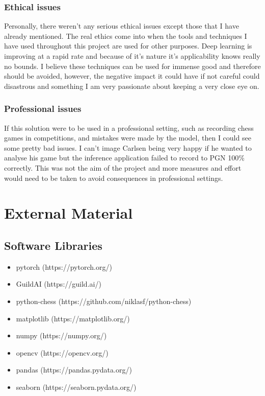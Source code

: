 \begin{appendices}
\subsection{Ethical issues}
Personally, there weren't any serious ethical issues except those that I have already mentioned.  The real ethics come into when the tools and techniques I have used 
throughout this project are used for other purposes.  Deep learning is improving at a rapid rate and because of it's nature it's applicability knows really no bounds.
I believe these techniques can be used for immense good and therefore should be avoided, however, the negative impact it could have if not careful could disastrous and 
something I am very passionate about keeping a very close eye on.

\subsection{Professional issues}
If this solution were to be used in a professional setting, such as recording chess games in competitions, and mistakes were made by the model, then I could see some 
pretty bad issues.  I can't image Carlsen being very happy if he wanted to analyse his game but the inference application failed to record to PGN 100\% correctly. 
This was not the aim of the project and more measures and effort would need to be taken to avoid consequences in professional settings.

%
%
\chapter{External Material}

\section{Software Libraries}
\begin{itemize}
    \item pytorch (https://pytorch.org/)
    \item GuildAI (https://guild.ai/)
    \item python-chess (https://github.com/niklasf/python-chess)
    \item matplotlib (https://matplotlib.org/)
    \item numpy (https://numpy.org/)
    \item opencv (https://opencv.org/)
    \item pandas (https://pandas.pydata.org/)
    \item seaborn (https://seaborn.pydata.org/)
\end{itemize}


\end{appendices}
